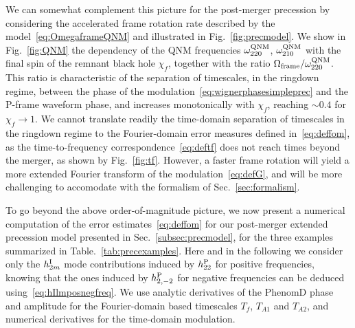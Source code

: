 \documentclass[aps,showpacs,twocolumn,
prd,superscriptaddress,nofootinbib]{revtex4-1}
\newcommand{\Tf}{T_{f}}
\newcommand{\SM}[1]{{\color{Red} #1}}
\begin{document}
We can somewhat complement this picture for the post-merger precession by considering the accelerated frame rotation rate described by the model~\eqref{eq:OmegaframeQNM} and illustrated in Fig.~\ref{fig:precmodel}. We show in Fig.~\ref{fig:QNM} the dependency of the QNM frequencies $\omega_{220}^{\rm QNM}$, $\omega_{210}^{\rm QNM}$ with the final spin of the remnant black hole $\chi_{f}$, together with the ratio $\Omega_{\rm frame} / \omega^{\rm QNM}_{220}$. This ratio is characteristic of the separation of timescales, in the ringdown regime, between the phase of the modulation~\eqref{eq:wignerphasesimpleprec} and the P-frame waveform phase, and increases monotonically with $\chi_{f}$, reaching $\sim 0.4$ for $\chi_{f} \rightarrow 1$. We cannot translate readily the time-domain separation of timescales in the ringdown regime to the Fourier-domain error measures defined in~\eqref{eq:deffom}, as the time-to-frequency correspondence~\eqref{eq:deftf} does not reach times beyond the merger, as shown by Fig.~\ref{fig:tf}. However, a faster frame rotation will yield a more extended Fourier transform of the modulation~\eqref{eq:defG}, and will be more challenging to accomodate with the formalism of Sec.~\ref{sec:formalism}.

To go beyond the above order-of-magnitude picture, we now present a numerical computation of the error estimates~\eqref{eq:deffom} for our post-merger extended precession model presented in Sec.~\ref{subsec:precmodel}, for the three examples summarized in Table.~\ref{tab:precexamples}. Here and in the following we consider only the $h^{\rm I}_{2 m}$ mode contributions induced by $h^{\rm P}_{22}$ for positive frequencies, knowing that the ones induced by $h^{\rm P}_{2,-2}$ for negative frequencies can be deduced using~\eqref{eq:hIlmposnegfreq}. We use analytic derivatives of the PhenomD phase and amplitude for the Fourier-domain based timescales $\Tf$, $T_{A1}$ and $T_{A2}$, and numerical derivatives for the time-domain modulation.

\end{document}
